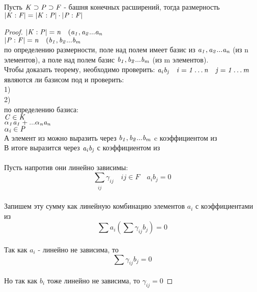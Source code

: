 \begin{theorem}
  Пусть $\mathit {K \supset P \supset F}$ - башня конечных расширений, тогда
  размерность $\mathit {|K:F|=|K:P|\cdot |P:F|}$
\end{theorem}

\begin{proof}
  $\mathit {|K:P|=n \quad (a_{1}, a_{2}...a_{n}}$ \\
  $\mathit {|P:F|=n \quad (b_{1}, b_{2}...b_{m}}$ \\
  по определению размерности, поле  над полем  имеет базис из
  $\mathit {a_{1}, a_{2}...a_{n}}$ (из n элементов), а поле  над полем 
  базис $\mathit {b_{1}, b_{2}...b_{m}}$ (из m элементов). \\
  Чтобы доказать теорему, необходимо проверить: $\mathit{a_i b_j \quad i = 1 \ldots
  n \quad j = 1 \ldots m}$ \\
  являются ли базисом  под  и проверить: \\
  1)  \\
  2)  \\
  по определению базиса: \\
  $\mathit {C \in K}$ \\
  $\mathit {\alpha_{1} a_{1}+...\alpha_{n}a_{n}}$\\
  $\mathit{\alpha_{i} \in P}$ \\
  А элемент из  можно выразить через $\mathit {b_{1}, b_{2}...b_{m}}$ c
  коэффициентом из  \\
  В итоге  выразится через $\mathit{a_{i}b_{j}}$ с коэффициентом из  \\

  \\
  Пусть напротив они линейно зависимы: \\
  \[ \sum_{\substack {ij}} \gamma_{ij} \quad ij \in F \quad a_{i}b_{j} = 0\] \\
  Запишем эту сумму как линейную комбинацию элементов $a_i$ с коэффициентами из
   \\
  \[ \sum a_{i} \left ( \sum \gamma_{ij} b_{j} \right) = 0 \] \\
  Так как $a_{i}$ - линейно не зависима, то \\
  \[\sum \gamma_{ij} b_{j} = 0\] \\
  Но так как $b_{i}$ тоже линейно не зависима, то $\gamma_{ij}=0$
\end{proof}

